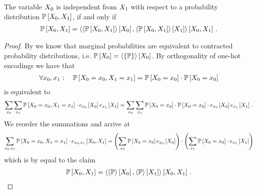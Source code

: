 \begin{theorem}
    \label{the:independenceProductCriterion}
    The variable $X_{0}$ is independent from $X_{1}$ with respect to a probability distribution $\mathbb{P}\left[X_{0},X_{1}\right]$, if and only if
    \begin{align*}
        \mathbb{P}\left[X_{0},X_{1}\right]
        = \left\langle \left\langle \mathbb{P}\left[X_{0},X_{1}\right]\right\rangle \left[ X_{0} \right],\left\langle \mathbb{P}\left[X_{0},X_{1}\right]\right\rangle \left[ X_{1} \right]\right\rangle \left[ X_{0},X_{1} \right] \, .
    \end{align*}
\end{theorem}
\begin{proof}
    By  we know that marginal probabilities are equivalent to contracted probability distributions, i.e. $\mathbb{P}\left[X_{0}\right] = \left\langle \{\mathbb{P}\}\right\rangle \left[ X_{0} \right] $.
    By orthogonality of one-hot encodings we have that
    \begin{align*}
        \forall x_{0}, x_{1} : \quad  \mathbb{P}\left[X_{0}=x_{0},X_{1}=x_{1}\right]
        = \mathbb{P}\left[X_{0}=x_{0}\right]
        \cdot
        \mathbb{P}\left[X_{0}=x_{0}\right]
    \end{align*}
    is equivalent to
    \begin{align*}
        \sum_{x_{0}}\sum_{x_{1}} \mathbb{P}\left[X_{0}=x_{0},X_{1}=x_{1}\right] \cdot e_{x_{0}}\left[X_{0}\right]e_{x_{1}}\left[X_{1}\right]
        = \sum_{x_{0}}\sum_{x_{1}}
        \mathbb{P}\left[X_{0}=x_{0}\right]
        \cdot
        \mathbb{P}\left[X_{0}=x_{0}\right] \cdot e_{x_{0}}\left[X_{0}\right]e_{x_{1}}\left[X_{1}\right] \, .
    \end{align*}
    We reorder the summations and arrive at
    \begin{align*}
        \sum_{x_{0},x_{1}}
        \mathbb{P}\left[X_{0}=x_{0},X_{1}=x_{1}\right] \cdot e_{x_{0},x_{1}}\left[X_{0}, X_{1}\right]
        = \left(\sum_{x_{0}}\mathbb{P}\left[X_{0}=x_{0}\right] e_{x_{0}}\left[X_{0}\right] \right)
        \cdot
        \left( \sum_{x_{1}}  \mathbb{P}\left[X_{0}=x_{0}\right] \cdot e_{x_{1}}\left[X_{1}\right]  \right)
    \end{align*}
    which is by  equal to the claim
    \begin{align*}
        \mathbb{P}\left[X_{0},X_{1}\right] = \left\langle \left\langle \mathbb{P}\right\rangle \left[ X_{0} \right],\left\langle \mathbb{P}\right\rangle \left[ X_{1} \right]\right\rangle \left[ X_{0},X_{1} \right] \, .
    \end{align*}
\end{proof}

